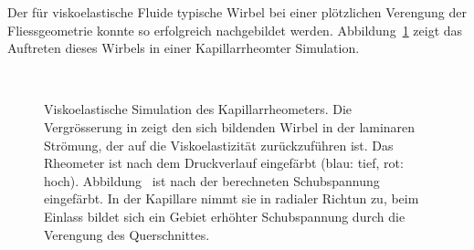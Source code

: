 Der für viskoelastische Fluide typische Wirbel bei einer plötzlichen Verengung der Fliessgeometrie \cite{Evans198611} konnte so erfolgreich nachgebildet werden. Abbildung~\ref{kapRheoVisco} zeigt das Auftreten dieses Wirbels in einer Kapillarrheomter Simulation.
%
\begin{figure}
    \centering
    \\
    \caption{Viskoelastische Simulation des Kapillarrheometers. Die Vergrösserung in  zeigt den sich bildenden Wirbel in der laminaren Strömung, der auf die Visko\-elastizität zurückzuführen ist. Das Rheometer ist nach dem Druckverlauf eingefärbt (blau: tief, rot: hoch). Abbildung~ ist nach der berechneten Schubspannung eingefärbt. In der Kapillare nimmt sie in radialer Richtun zu, beim Einlass bildet sich ein Gebiet erhöhter Schubspannung durch die Verengung des Querschnittes.}
    \label{kapRheoVisco}
\end{figure}
%

